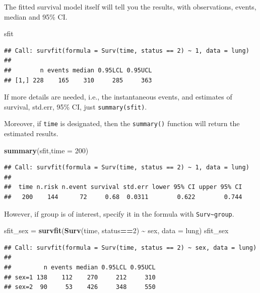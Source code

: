 \documentclass[
]{ctexart}
\newenvironment{Shaded}{\begin{snugshade}}{\end{snugshade}}
\newcommand{\AttributeTok}[1]{\textcolor[rgb]{0.13,0.29,0.53}{#1}}
\newcommand{\DecValTok}[1]{\textcolor[rgb]{0.00,0.00,0.81}{#1}}
\newcommand{\FunctionTok}[1]{\textcolor[rgb]{0.13,0.29,0.53}{\textbf{#1}}}
\newcommand{\NormalTok}[1]{#1}
\newcommand{\OtherTok}[1]{\textcolor[rgb]{0.56,0.35,0.01}{#1}}
\newcommand{\SpecialCharTok}[1]{\textcolor[rgb]{0.81,0.36,0.00}{\textbf{#1}}}
\begin{document}
The fitted survival model itself will tell you the results, with
observations, events, median and 95\% CI.

\begin{Shaded}
\begin{Highlighting}[]
\NormalTok{sfit}
\end{Highlighting}
\end{Shaded}

\begin{verbatim}
## Call: survfit(formula = Surv(time, status == 2) ~ 1, data = lung)
## 
##        n events median 0.95LCL 0.95UCL
## [1,] 228    165    310     285     363
\end{verbatim}

If more details are needed, i.e., the instantaneous events, and
estimates of survival, std.err, 95\% CI, just \texttt{summary(sfit)}.

Moreover, if \texttt{time} is designated, then the \texttt{summary()}
function will return the estimated results.

\begin{Shaded}
\begin{Highlighting}[]
\FunctionTok{summary}\NormalTok{(sfit,}\AttributeTok{time =} \DecValTok{200}\NormalTok{)}
\end{Highlighting}
\end{Shaded}

\begin{verbatim}
## Call: survfit(formula = Surv(time, status == 2) ~ 1, data = lung)
## 
##  time n.risk n.event survival std.err lower 95% CI upper 95% CI
##   200    144      72     0.68  0.0311        0.622        0.744
\end{verbatim}

However, if group is of interest, specify it in the formula with
\texttt{Surv\textasciitilde{}group}.

\begin{Shaded}
\begin{Highlighting}[]
\NormalTok{sfit\_sex }\OtherTok{=} \FunctionTok{survfit}\NormalTok{(}\FunctionTok{Surv}\NormalTok{(time, status}\SpecialCharTok{==}\DecValTok{2}\NormalTok{) }\SpecialCharTok{\textasciitilde{}}\NormalTok{ sex, }\AttributeTok{data =}\NormalTok{ lung)}
\NormalTok{sfit\_sex}
\end{Highlighting}
\end{Shaded}

\begin{verbatim}
## Call: survfit(formula = Surv(time, status == 2) ~ sex, data = lung)
## 
##         n events median 0.95LCL 0.95UCL
## sex=1 138    112    270     212     310
## sex=2  90     53    426     348     550
\end{verbatim}
\end{document}
